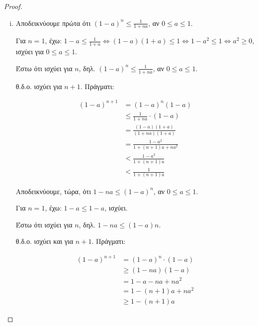 \begin{multicols}{2}
\begin{enumerate}
\begin{proof}
\begin{enumerate}[i)]
                \item
                   
                    Αποδεικνύουμε πρώτα ότι $ (1-a)^{n} \leq \frac{1}{1+na}$,
                    αν $ 0 \leq a \leq 1 $.

                    Για $ n=1 $, έχω: $ 1-a \leq \frac{1}{1+a} 
                    \Leftrightarrow (1-a)(1+a) \leq 1 \Leftrightarrow 
                    1-a^{2} \leq 1 \Leftrightarrow a^{2} \geq 0  $, ισχύει
                    για $ 0 \leq a \leq 1 $. 

                    Έστω ότι ισχύει για $n$, δηλ. $ (1-a)^{n} \leq
                    \frac{1}{1+na} $, αν $ 0 \leq a \leq 1 $.

                    θ.δ.ο. ισχύει για $ n+1 $. Πράγματι: 

                    \begin{align*}
                        (1-a)^{n+1} &= (1-a)^{n}(1-a) \\
                                    &\leq \frac{1}{1+na} \cdot (1-a) \\
                                    &= \frac{(1-a)(1+a)}{(1+na)(1+a)} \\
                                    &= \frac{1-a^{2}}{1+(n+1)a +na^{2}} \\
                                    &< \frac{1-a^{2}}{1 + (n+1)a} \\
                                    &< \frac{1}{1 + (n+1)a} 
                    \end{align*}

                    Αποδεικνύουμε, τώρα, ότι $ 1-na \leq (1-a)^{n} $, αν 
                    $ 0 \leq a \leq 1 $. 

                    Για $ n=1 $, έχω: $ 1-a \leq 1-a $, ισχύει.

                    Έστω ότι ισχύει για $n$, δηλ. $ 1-na \leq (1-a){n} $.

                    θ.δ.ο. ισχύει και για $ n+1 $. Πράγματι:

                    \begin{align*}
                        (1-a)^{n+1}&=(1-a)^{n}\cdot (1-a) \\
                                   &\geq (1-na)(1-a) \\
                                   &=1-a-na+na^{2} \\
                                   &= 1-(n+1)a + na^{2} \\
                                   &\geq 1-(n+1)a
                    \end{align*}
            \end{enumerate}
        \end{proof}


\end{enumerate}
\end{multicols}
